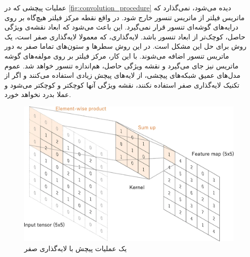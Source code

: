 عملیات پیچشی که در \cref{fig:convolution_procedure} دیده‌ می‌شود، نمی‌گذارد که ماتریس فیلتر از ماتریس تنسور خارج شود. در واقع نقطه مرکز فیلتر هیچ‌گاه بر روی درایه‌های گوشه‌ای تنسور قرار نمی‌گیرد. این باعث می‌شود که ابعاد نقشه‌ی ویژگی‌ حاصل، کوچک‌تر از ابعاد تنسور باشد. لایه‌گذاری‌، که معمولا لایه‌گذاری صفر‌ است، یک روش برای حل این مشکل است. در این روش سطرها و ستون‌های تماما صفر به دور ماتریس تنسور اضافه می‌شوند. با این کار، مرکز فیلتر بر روی مولفه‌های گوشه ماتریس نیز جای می‌گیرد و نقشه ویژگی حاصل، هم‌اندازه تنسور خواهد شد. عموم مدل‌های عمیق شبکه‌های پیچشی، از لایه‌های پیچش زیادی استفاده می‌کنند و اگر از تکنیک لایه‌گذاری صفر استفاده نکنند، نقشه ویژگی آنها کوچکتر و کوچکتر می‌شود و عملا بدرد نخواهد خورد.

\begin{figure}[h!]
    \centering
    \includegraphics[width=1\linewidth]{figures/Zero_Padding.png}
    \caption{یک عملیات پیچش با لایه‌گذاری صفر \cite{yamashita2018convolutional}}
    \label{fig:zero_padding}
\end{figure}

